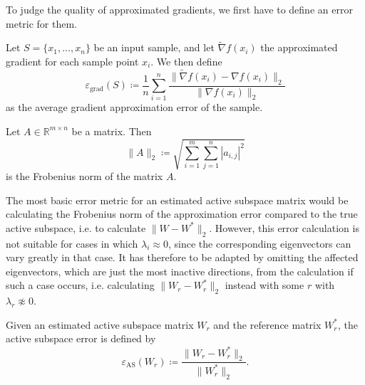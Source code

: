 \documentclass[
  a4paper,  %
  twoside,  %
  bibliography=totoc,
  headsepline,
  cleardoublepage=empty,
  parskip=half,
  draft=false
]{scrbook}
\begin{document}
To judge the quality of approximated gradients, we first have to define an error metric for them.

\begin{definition}
Let $S=\{x_1, \dots, x_n\}$ be an input sample, and let $\widetilde{\nabla} f(x_i)$ the approximated gradient for each sample point $x_i$. We then define
\begin{equation}
\varepsilon_{\text{grad}}(S) \coloneqq \frac{1}{n} \sum_{i=1}^n \frac{\| \widetilde{\nabla} f(x_i) - \nabla f(x_i) \|_2}{\| \nabla f(x_i) \|_2}
\label{eq:e_grad}
\end{equation}
as the average gradient approximation error of the sample.
\end{definition}

\begin{definition}
Let $A \in \mathds{R}^{m \times n}$ be a matrix. Then
\begin{equation}
\| A\|_2 \coloneqq \sqrt{\sum_{i=1}^m \sum_{j=1}^n |a_{i,j}|^2}
\nonumber
\end{equation}
is the Frobenius norm of the matrix $A$.
\end{definition}

The most basic error metric for an estimated active subspace matrix would be calculating the Frobenius norm of the approximation error compared to the true active subspace, i.e. to calculate $\| W - W^\ast \|_2$.
However, this error calculation is not suitable for cases in which $\lambda_i \approx 0$, since the corresponding eigenvectors can vary greatly in that case.
It has therefore to be adapted by omitting the affected eigenvectors, which are just the most inactive directions, from the calculation if such a case occurs, i.e. calculating $\| W_r - W_r^\ast \|_2$ instead with some $r$ with $\lambda_r \napprox 0$.

\begin{definition}
Given an estimated active subspace matrix $W_r$ and the reference matrix $W_r^*$, the
active subspace error is defined by
\begin{equation}
\varepsilon_{\text{AS}}(W_r) \coloneqq \frac{\| W_r - W_r^* \|_2}{\| W_r^* \|_2}.
\label{eq:e_as}
\end{equation}
\end{definition}
\end{document}
